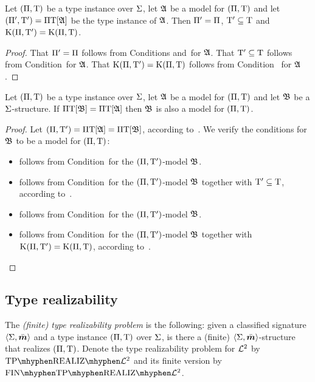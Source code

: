 \begin{remark}\label{rem:str-tpi-kings-eq}
Let $(\Pi,\mathrm{T})$ be a type instance over $\mathrm{\Sigma}$, 
let $\mathfrak{A}$ be a model for $(\Pi,\mathrm{T})$
and let $({\Pi'},{\mathrm{T}'}) =\Pi\mathrm{T}[\mathfrak{A}]$ be the type instance of $\mathfrak{A}$.
Then ${\Pi'} = \Pi$, ${\mathrm{T}'} \subseteq \mathrm{T}$ and $\mathrm{K}(\Pi,{\mathrm{T}'}) =
\mathrm{K}(\Pi,\mathrm{T})$.
\end{remark}
\begin{proof}
That ${\Pi'} = \Pi$ follows from Conditions 
and~ for $\mathfrak{A}$.
That ${\mathrm{T}'} \subseteq \mathrm{T}$ follows from Condition~ for
$\mathfrak{A}$.
That $\mathrm{K}(\Pi,{\mathrm{T}'}) = \mathrm{K}(\Pi,\mathrm{T})$ follows from Condition~
for $\mathfrak{A}$.
\end{proof}
\begin{remark}
Let $(\Pi,\mathrm{T})$ be a type instance over $\mathrm{\Sigma}$,
let $\mathfrak{A}$ be a model for $(\Pi,\mathrm{T})$
and let $\mathfrak{B}$ be a $\mathrm{\Sigma}$-structure.
If $\Pi\mathrm{T}[\mathfrak{B}] = \Pi\mathrm{T}[\mathfrak{A}]$ then $\mathfrak{B}$ is also a model for
$(\Pi,\mathrm{T})$.
\end{remark}
\begin{proof}
Let $(\Pi,{\mathrm{T}'}) = \Pi\mathrm{T}[\mathfrak{A}] = \Pi\mathrm{T}[\mathfrak{B}]$,
according to~.
We verify the conditions for $\mathfrak{B}$ to be a model for $(\Pi,\mathrm{T})$:
\begin{itemize}
  \item[\refcondrealizI]
  follows from Condition~ for the $(\Pi,{\mathrm{T}'})$-model $\mathfrak{B}$.
  \item[\refcondrealizII]
  follows from Condition~ for the $(\Pi,{\mathrm{T}'})$-model
  $\mathfrak{B}$ together with ${\mathrm{T}'} \subseteq \mathrm{T}$, according
  to~.
  \item[\refcondrealizp]
  follows from Condition~ for the $(\Pi,{\mathrm{T}'})$-model
  $\mathfrak{B}$.
  \item[\refcondrealizk]
  follows from Condition~ for the $(\Pi,{\mathrm{T}'})$-model
  $\mathfrak{B}$ together with $\mathrm{K}(\Pi,{\mathrm{T}'}) = \mathrm{K}(\Pi,\mathrm{T})$, according
  to~.
\end{itemize}
\end{proof}

\subsection{Type realizability}
\begin{definition}
The \emph{(finite) type realizability problem} is the following:
given a classified signature $\left\langle \mathrm{\Sigma},\bar{\bm{m}} \right\rangle$ and a type instance
$(\Pi,\mathrm{T})$ over $\mathrm{\Sigma}$, is there a (finite)
$\left\langle \mathrm{\Sigma},\bar{\bm{m}} \right\rangle$-structure that realizes $(\Pi,\mathrm{T})$.
Denote the type realizability problem for $\mathcal{L}^{2}$ by
$\Real{\vFo2}$ and its finite version by $\FinReal{\vFo2}$.
\end{definition}

